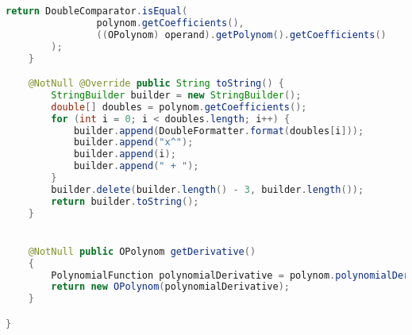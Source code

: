 \begin{lstlisting}[caption=OPolynom (Schwenke),label=list:OPolynom,language=Java]
        return DoubleComparator.isEqual(
                polynom.getCoefficients(),
                ((OPolynom) operand).getPolynom().getCoefficients()
        );
    }

    @NotNull @Override public String toString() {
        StringBuilder builder = new StringBuilder();
        double[] doubles = polynom.getCoefficients();
        for (int i = 0; i < doubles.length; i++) {
            builder.append(DoubleFormatter.format(doubles[i]));
            builder.append("x^");
            builder.append(i);
            builder.append(" + ");
        }
        builder.delete(builder.length() - 3, builder.length());
        return builder.toString();
    }


    @NotNull public OPolynom getDerivative()
    {
        PolynomialFunction polynomialDerivative = polynom.polynomialDerivative();
        return new OPolynom(polynomialDerivative);
    }

}
\end{lstlisting}    

